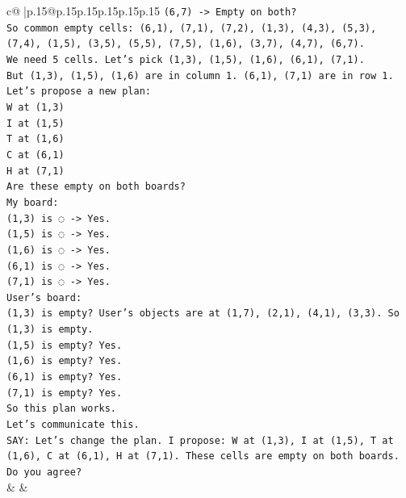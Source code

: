\documentclass{article}
\begin{document}
{\begin{supertabular}{c@{$\;$}|p{.15\linewidth}@{}p{.15\linewidth}p{.15\linewidth}p{.15\linewidth}p{.15\linewidth}p{.15\linewidth}}
{{{\texttt{(6,7) {-}> Empty on both?} \\
\texttt{So common empty cells: (6,1), (7,1), (7,2), (1,3), (4,3), (5,3), (7,4), (1,5), (3,5), (5,5), (7,5), (1,6), (3,7), (4,7), (6,7).} \\
\texttt{We need 5 cells. Let's pick (1,3), (1,5), (1,6), (6,1), (7,1).} \\
\texttt{But (1,3), (1,5), (1,6) are in column 1. (6,1), (7,1) are in row 1.} \\
\texttt{Let's propose a new plan:} \\
\texttt{W at (1,3)} \\
\texttt{I at (1,5)} \\
\texttt{T at (1,6)} \\
\texttt{C at (6,1)} \\
\texttt{H at (7,1)} \\
\texttt{Are these empty on both boards?} \\
\texttt{My board:} \\
\texttt{(1,3) is ◌ {-}> Yes.} \\
\texttt{(1,5) is ◌ {-}> Yes.} \\
\texttt{(1,6) is ◌ {-}> Yes.} \\
\texttt{(6,1) is ◌ {-}> Yes.} \\
\texttt{(7,1) is ◌ {-}> Yes.} \\
\texttt{User's board:} \\
\texttt{(1,3) is empty? User's objects are at (1,7), (2,1), (4,1), (3,3). So (1,3) is empty.} \\
\texttt{(1,5) is empty? Yes.} \\
\texttt{(1,6) is empty? Yes.} \\
\texttt{(6,1) is empty? Yes.} \\
\texttt{(7,1) is empty? Yes.} \\
\texttt{So this plan works.} \\
\texttt{Let's communicate this.} \\
\texttt{SAY: Let's change the plan. I propose: W at (1,3), I at (1,5), T at (1,6), C at (6,1), H at (7,1). These cells are empty on both boards. Do you agree?} \\
            }
        }
    }
    & & \\ \\


\end{supertabular}}
\end{document}
